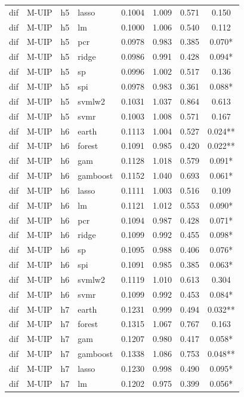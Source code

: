 \begin{ThreePartTable}
\begin{longtable}[t]{llclcccc}
dif & M-UIP & h5 & lasso & 0.1004 & 1.009 & 0.571 & 0.150\\
dif & M-UIP & h5 & lm & 0.1000 & 1.006 & 0.540 & 0.112\\
dif & M-UIP & h5 & pcr & 0.0978 & 0.983 & 0.385 & 0.070*\\
dif & M-UIP & h5 & ridge & 0.0986 & 0.991 & 0.428 & 0.094*\\
dif & M-UIP & h5 & sp & 0.0996 & 1.002 & 0.517 & 0.136\\
dif & M-UIP & h5 & spi & 0.0978 & 0.983 & 0.361 & 0.088*\\
dif & M-UIP & h5 & svmlw2 & 0.1031 & 1.037 & 0.864 & 0.613\\
dif & M-UIP & h5 & svmr & 0.1003 & 1.008 & 0.571 & 0.167\\
\addlinespace
dif & M-UIP & h6 & earth & 0.1113 & 1.004 & 0.527 & 0.024**\\
dif & M-UIP & h6 & forest & 0.1091 & 0.985 & 0.420 & 0.022**\\
dif & M-UIP & h6 & gam & 0.1128 & 1.018 & 0.579 & 0.091*\\
dif & M-UIP & h6 & gamboost & 0.1152 & 1.040 & 0.693 & 0.061*\\
dif & M-UIP & h6 & lasso & 0.1111 & 1.003 & 0.516 & 0.109\\
dif & M-UIP & h6 & lm & 0.1121 & 1.012 & 0.553 & 0.090*\\
dif & M-UIP & h6 & pcr & 0.1094 & 0.987 & 0.428 & 0.071*\\
dif & M-UIP & h6 & ridge & 0.1099 & 0.992 & 0.455 & 0.098*\\
dif & M-UIP & h6 & sp & 0.1095 & 0.988 & 0.406 & 0.076*\\
dif & M-UIP & h6 & spi & 0.1091 & 0.985 & 0.385 & 0.063*\\
dif & M-UIP & h6 & svmlw2 & 0.1119 & 1.010 & 0.613 & 0.304\\
dif & M-UIP & h6 & svmr & 0.1099 & 0.992 & 0.453 & 0.084*\\
\addlinespace
dif & M-UIP & h7 & earth & 0.1231 & 0.999 & 0.494 & 0.032**\\
dif & M-UIP & h7 & forest & 0.1315 & 1.067 & 0.767 & 0.163\\
dif & M-UIP & h7 & gam & 0.1207 & 0.980 & 0.417 & 0.058*\\
dif & M-UIP & h7 & gamboost & 0.1338 & 1.086 & 0.753 & 0.048**\\
dif & M-UIP & h7 & lasso & 0.1230 & 0.998 & 0.490 & 0.095*\\
dif & M-UIP & h7 & lm & 0.1202 & 0.975 & 0.399 & 0.056*\\

\end{longtable}
\end{ThreePartTable}

